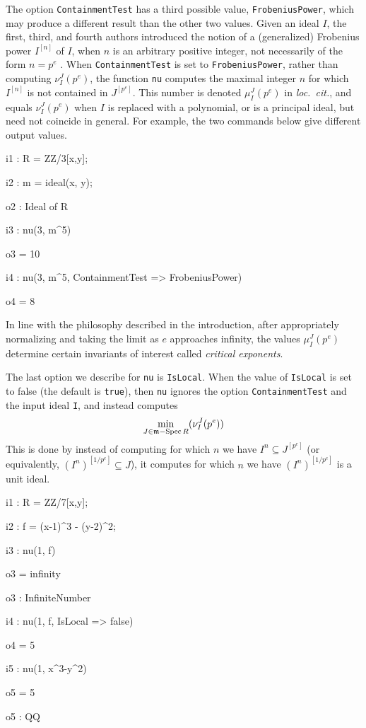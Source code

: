 \documentclass{amsart}
\begin{document}

The option {\tt ContainmentTest} has a third possible value, {\tt FrobeniusPower}, which may produce a different result than the other two values.
Given an ideal $I$, the first, third, and fourth authors introduced the notion of a (generalized) Frobenius power $I^{[n]}$ of $I$, when $n$ is an arbitrary positive integer, not necessarily of the form $n = p^e$ \cite{hernandez+etal.frobenius_powers}.
When {\tt ContainmentTest} is set to {\tt FrobeniusPower}, rather than  computing $\nu_I^J(p^e)$, the function {\tt nu} computes the
maximal integer $n$ for which $I^{[n]}$ is not contained in $J^{[p^e]}$.  This number is denoted $\mu_I^J(p^e)$ in \emph{loc.\ cit.}, and equals $\nu_I^J(p^e)$ when $I$ is replaced with a polynomial, or is a principal ideal, but need not coincide in general.
For example, the two commands below give different output values.

\medspace
{\small
{}
\begin{MyVerbatim}

i1 : R = ZZ/3[x,y];

i2 : m = ideal(x, y);

o2 : Ideal of R

i3 : nu(3, m^5)

o3 = 10

i4 : nu(3, m^5, ContainmentTest => FrobeniusPower)

o4 = 8
\end{MyVerbatim}
}

\medspace
\noindent In line with the philosophy described in the introduction, after appropriately normalizing and taking the limit as $e$ approaches infinity, the values $\mu_I^J(p^e)$ determine certain invariants of interest called \emph{critical exponents}.

The last option we describe for {\tt nu} is {\tt IsLocal}.  When the value of {\tt IsLocal} is set to false (the default is {\tt true}), then {\tt nu} ignores the option {\tt ContainmentTest} and the input ideal {\tt I}, and instead computes
\[
\min_{J \in \mathfrak{m}-\operatorname{{Spec}} R} (\nu_I^J(p^e))
\]
This is done by instead of computing for which $n$ we have $I^{n} \subseteq J^{[p^e]}$ (or equivalently, $(I^n)^{[1/p^e]} \subseteq J$), it computes for which $n$ we have $(I^n)^{[1/p^e]}$ is a unit ideal.

\medspace
{\small
{}
\begin{MyVerbatim}
    i1 : R = ZZ/7[x,y];

    i2 : f = (x-1)^3 - (y-2)^2;

    i3 : nu(1, f)

    o3 = infinity

    o3 : InfiniteNumber

    i4 : nu(1, f, IsLocal => false)

    o4 = 5

    i5 : nu(1, x^3-y^2)

    o5 = 5

    o5 : QQ
\end{MyVerbatim}
}
\end{document}
